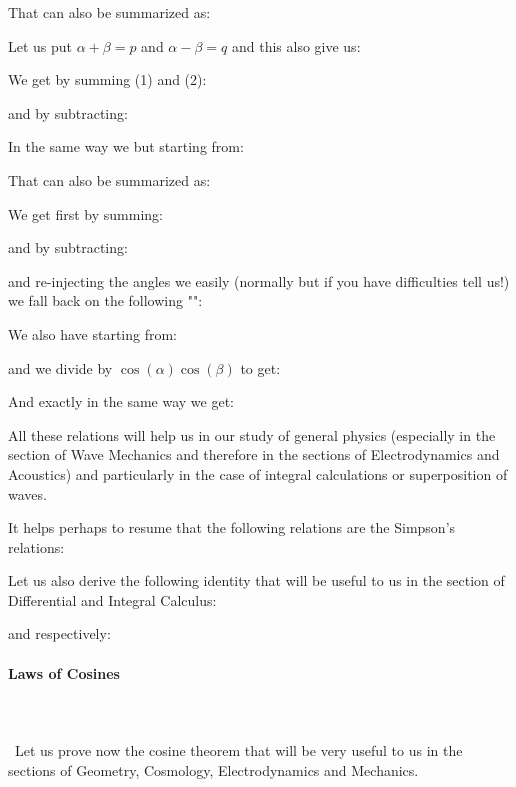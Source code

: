 	That can also be summarized as:
	
	Let us put $\alpha+\beta=p$ and $\alpha-\beta=q$ and this also give us:
	
	We get by summing (1) and (2):
	
	and by subtracting:
	
	In the same way we but starting from:
	
	That can also be summarized as:
	
	We get first by summing:
	
	and by subtracting:
	
	and re-injecting the angles we easily (normally but if you have difficulties tell us!) we fall back on the following "":
	
	
	We also have starting from:	
	
	and we divide by $\cos(\alpha)\cos(\beta)$ to get:
	
	And exactly in the same way we get:
	
	
	All these relations will help us in our study of general physics (especially in the section of Wave Mechanics and therefore in the sections of Electrodynamics and Acoustics) and particularly in the case of integral calculations or superposition of waves.
	
	\begin{tcolorbox}[title=Remark,colframe=black,arc=10pt]
It helps perhaps to resume that the following relations are the Simpson's relations:
	
	\end{tcolorbox}
	Let us also derive the following identity that will be useful to us in the section of Differential and Integral Calculus:
	
	and respectively:
	
	
	\paragraph{Laws of Cosines}\label{law of cosines}\mbox{}\\\\\
	Let us prove now the cosine theorem that will be very useful to us in the sections of Geometry, Cosmology, Electrodynamics and Mechanics.
	
